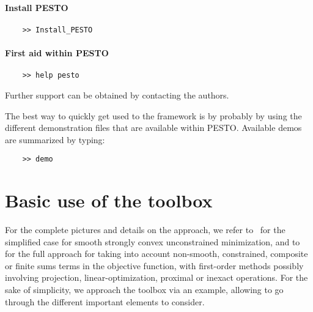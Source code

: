 \documentclass[11pt,a4paper]{article}
\newcommand{\pesto}{{PESTO }}
\begin{document}
	\paragraph{Install \pesto}
	\begin{verbatim}
	>> Install_PESTO
	\end{verbatim}
	
	\paragraph{First aid within \pesto}
	\begin{verbatim}
	>> help pesto
	\end{verbatim}
	Further support can be obtained by contacting the authors.
	
	The best way to quickly get used to the framework is by probably by using the different demonstration files that are available within PESTO. Available demos are summarized by typing:
	\begin{verbatim}
	>> demo
	\end{verbatim}
	
	\clearpage
	
	\section{Basic use of the toolbox}	%
	\label{sec:basicuse}
	
	For the complete pictures and details on the approach, we refer to~\cite[Section 1\&3]{taylor2015smooth} for the simplified case for smooth strongly convex unconstrained minimization, and to~\cite[Section 1\&2]{taylor2015exact} for the full approach for taking into account non-smooth, constrained, composite or finite sums terms in the objective function, with first-order methods possibly involving projection, linear-optimization, proximal or inexact operations. For the sake of simplicity, we approach the toolbox via an example, allowing to go through the different important elements to consider.
	
\end{document}
